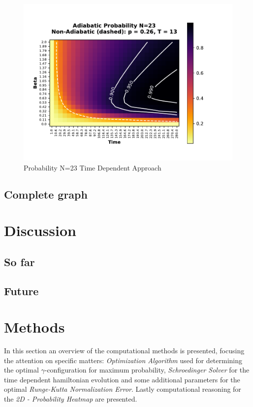 \documentclass[aps,pra,reprint, onecolumn]{revtex4-2}
\begin{document}
\begin{figure}[ht]
\includegraphics{./figures/23_probability_heatmap.pdf}%
\caption{Probability N=23 Time Dependent Approach}
\end{figure}

\subsection{Complete graph}


\section{Discussion}
\subsection{So far}
\subsection{Future}


\section{Methods}
In this section an overview of the computational methods is presented, focusing the attention on specific matters: \textit{Optimization Algorithm} used for determining the optimal $\gamma$-configuration for maximum probability, \textit{Schroedinger Solver} for the time dependent hamiltonian evolution and some additional parameters for the optimal \textit{Runge-Kutta Normalization Error}. Lastly computational reasoning for the \textit{2D - Probability Heatmap} are presented. \\
\end{document}
